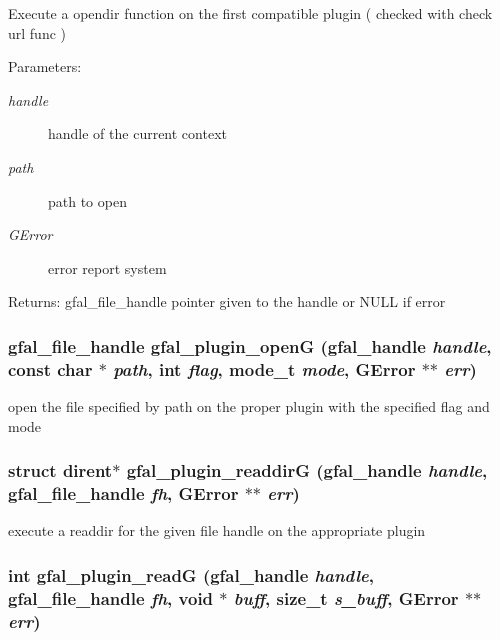 Execute a opendir function on the first compatible plugin ( checked with check url func ) \begin{Desc}
\item[Parameters:]
\begin{description}
\item[{\em handle}]handle of the current context \item[{\em path}]path to open \item[{\em GError}]error report system \end{description}
\end{Desc}
\begin{Desc}
\item[Returns:]gfal\_\-file\_\-handle pointer given to the handle or NULL if error \end{Desc}
\subsubsection{\setlength{\rightskip}{0pt plus 5cm}gfal\_\-file\_\-handle gfal\_\-plugin\_\-open\-G (gfal\_\-handle {\em handle}, const char $\ast$ {\em path}, int {\em flag}, mode\_\-t {\em mode}, GError $\ast$$\ast$ {\em err})}\label{gfal__common__plugin_8h_322dfbe0ad1e144573719ed08151281e}


open the file specified by path on the proper plugin with the specified flag and mode 
\subsubsection{\setlength{\rightskip}{0pt plus 5cm}struct dirent$\ast$ gfal\_\-plugin\_\-readdir\-G (gfal\_\-handle {\em handle}, gfal\_\-file\_\-handle {\em fh}, GError $\ast$$\ast$ {\em err})}\label{gfal__common__plugin_8h_7fd9e55c89de0f0a85127972cecffcfd}


execute a readdir for the given file handle on the appropriate plugin 
\subsubsection{\setlength{\rightskip}{0pt plus 5cm}int gfal\_\-plugin\_\-read\-G (gfal\_\-handle {\em handle}, gfal\_\-file\_\-handle {\em fh}, void $\ast$ {\em buff}, size\_\-t {\em s\_\-buff}, GError $\ast$$\ast$ {\em err})}\label{gfal__common__plugin_8h_d536879bc7813a35bc79318ce43f0b57}



